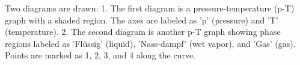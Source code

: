 Two diagrams are drawn:  
1. The first diagram is a pressure-temperature (p-T) graph with a shaded region. The axes are labeled as 'p' (pressure) and 'T' (temperature).  
2. The second diagram is another p-T graph showing phase regions labeled as 'Flüssig' (liquid), 'Nass-dampf' (wet vapor), and 'Gas' (gas). Points are marked as 1, 2, 3, and 4 along the curve.